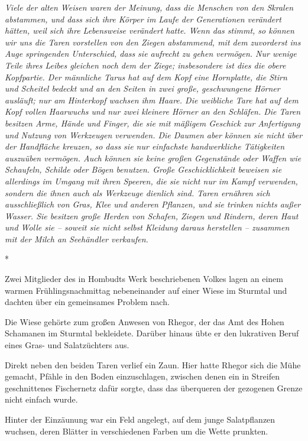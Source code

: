\documentclass[10pt, a4paper, oneside]{book}
\begin{document}
\begin{multicols}{2}
\textit{Viele der alten Weisen waren der Meinung, dass die Menschen von den Skralen abstammen, und dass sich ihre Körper im Laufe der Generationen verändert hätten, weil sich ihre Lebensweise verändert hatte. Wenn das stimmt, so können wir uns die Taren vorstellen von den Ziegen abstammend, mit dem zuvorderst ins Auge springenden Unterschied, dass sie aufrecht zu gehen vermögen. Nur wenige Teile ihres Leibes gleichen noch dem der Ziege; insbesondere ist dies die obere Kopfpartie. Der männliche Tarus hat auf dem Kopf eine Hornplatte, die Stirn und Scheitel bedeckt und an den Seiten in zwei große, geschwungene Hörner ausläuft; nur am Hinterkopf wachsen ihm Haare. Die weibliche Tare hat auf dem Kopf vollen Haarwuchs und nur zwei kleinere Hörner an den Schläfen. Die Taren besitzen Arme, Hände und Finger, die sie mit mäßigem Geschick zur Anfertigung und Nutzung von Werkzeugen verwenden. Die Daumen aber können sie nicht über der Handfläche kreuzen, so dass sie nur einfachste handwerkliche Tätigkeiten auszuüben vermögen. Auch können sie keine großen Gegenstände oder Waffen wie Schaufeln, Schilde oder Bögen benutzen. Große Geschicklichkeit beweisen sie allerdings im Umgang mit ihren Speeren, die sie nicht nur im Kampf verwenden, sondern die ihnen auch als Werkzeuge dienlich sind. Taren ernähren sich ausschließlich von Gras, Klee und anderen Pflanzen, und sie trinken nichts außer Wasser. Sie besitzen große Herden von Schafen, Ziegen und Rindern, deren Haut und Wolle sie – soweit sie nicht selbst Kleidung daraus herstellen – zusammen mit der Milch an Seehändler verkaufen.}

\begin{center}
    *
\end{center}

Zwei Mitglieder des in Hombudts Werk beschriebenen Volkes lagen an einem warmen Frühlingsnachmittag nebeneinander auf einer Wiese im Sturmtal und dachten über ein gemeinsames Problem nach. 

Die Wiese gehörte zum großen Anwesen von Rhegor, der das Amt des Hohen Schamanen im Sturmtal bekleidete. Darüber hinaus übte er den lukrativen Beruf eines Gras- und Salatzüchters aus. 

Direkt neben den beiden Taren verlief ein Zaun. Hier hatte Rhegor sich die Mühe gemacht, Pfähle in den Boden einzuschlagen, zwischen denen ein in Streifen geschnittenes Fischernetz dafür sorgte, dass das überqueren der gezogenen Grenze nicht einfach wurde. 

Hinter der Einzäunung war ein Feld angelegt, auf dem junge Salatpflanzen wuchsen, deren Blätter in verschiedenen Farben um die Wette prunkten. 


\end{multicols}
\end{document}

